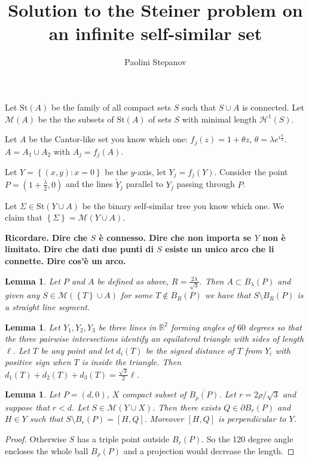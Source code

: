 \documentclass{article}
\title{Solution to the Steiner problem on an infinite self-similar set}
\author{Paolini Stepanov}
\newcommand{\RR}{\mathbb R}
\renewcommand{\H}{\mathcal H}
\newcommand{\ENCLOSE}[1]{\left\{#1\right\}}
\newcommand{\St}{\mathrm{St}}
\newcommand{\M}{\mathcal{M}}
\renewcommand{\H}{\mathcal{H}}
\newtheorem{lemma}[theorem]{Lemma}
\theoremstyle{definition}
\theoremstyle{remark}
\begin{document}
\maketitle
Let $\St(A)$ be the family of all compact sets $S$ such that 
$S\cup A$ is connected.
Let $\M(A)$ be the the subsets of $\St(A)$ of sets $S$ 
with minimal length $\H^1(S)$.

Let $A$ be the Cantor-like set you know which one: 
$f_j(z) = 1 + \theta z$,
$\theta = \lambda e^{i \frac \pi 3}$.
$A=A_1\cup A_2$ 
with $A_j = f_j(A)$.

Let $Y=\ENCLOSE{(x,y)\colon x=0}$ be the $y$-axis,
let $Y_j = f_j(Y)$.
Consider the point $P=(1+\frac\lambda 2,0)$ 
and the lines $\tilde Y_j$ parallel to $Y_j$ 
passing through $P$.

Let $\Sigma\in \St(Y\cup A)$ be the binary self-similar 
tree you know which one.
We claim that $\ENCLOSE{\Sigma} = \M(Y\cup A)$.

\textbf{Ricordare. Dire che $S$ è connesso. 
Dire che non importa se $Y$ non è limitato.
Dire che dati due punti di $S$ esiste un unico arco che li connette.
Dire cos'è un arco. }

\begin{lemma}\label{lm:01}
  Let $P$ and $A$ be defined as above,
  $R=\frac{2\lambda}{\sqrt 3}$.
  Then $A\subset B_\lambda(P)$ and 
  given any $S\in \M(\ENCLOSE{T}\cup A)$ 
  for some $T\not \in B_R(P)$
  we have that $S\setminus B_R(P)$ is a straight line segment.
\end{lemma}

\begin{lemma}\label{lm:tripod}
  Let $Y_1,Y_2,Y_3$ be three lines in $\RR^2$
  forming angles of $60$ degrees so that 
  the three pairwise intersections identify
  an equilateral triangle with sides of length $\ell$.
  Let $T$ be any point and let $d_i(T)$ be 
  the signed distance of $T$ from $Y_i$
  with positive sign when $T$ is inside the triangle.
  Then $d_1(T) + d_2(T) + d_3(T) = \frac{\sqrt 3}{2}\ell$.
\end{lemma}

\begin{lemma}
Let $P=(d,0)$, $X$ compact subset of $\overline{B_\rho(P)}$.
Let $r=2\rho/\sqrt 3$ and suppose that $r<d$.
Let $S \in \M(Y\cup X)$.
Then there exists $Q\in \partial B_r(P)$ and $H\in Y$
such that $S\setminus B_r(P) = [H,Q]$.
Moreover $[H,Q]$ is perpendicular to $Y$.
\end{lemma}
\begin{proof}
    Otherwise $S$ has a triple point outside $B_r(P)$.
    So the 120 degree angle encloses the whole ball $B_\rho(P)$ 
    and a projection would decrease the length.
\end{proof}
\end{document}
